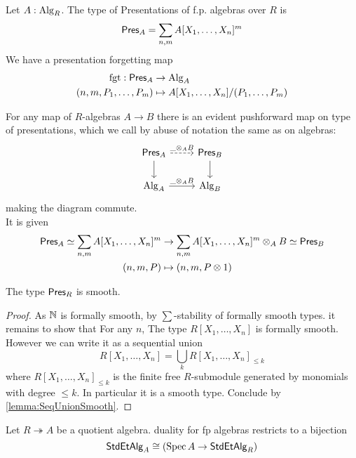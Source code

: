 \begin{definition}
	Let $A : \operatorname{Alg}_R$.
	 The type of Presentations of f.p. algebras over $R$ is 
	\[
	\mathsf{Pres}_A = \sum_{n,m} A[X_1,\hdots,X_n]^m
	\]
	We have a presentation forgetting map 
	\begin{align*}
		\mathrm{fgt} :\mathsf{Pres}_A &\to \operatorname{Alg}_A \\
		(n,m, P_1,\hdots,P_m) &\mapsto A[X_1,\hdots,X_n] / (P_1,\hdots,P_m)
	\end{align*}

	
\end{definition}
\begin{construction}
	For any map of $R$-algebras $A \to B$ there is an evident pushforward map on type of presentations, which we call by abuse of notation the same as on algebras:
	\[\begin{tikzcd}
		{\Pres_A} & {\Pres_B} \\
		{\Alg_A} & {\Alg_B}
		\arrow["\_ \otimes_A B",dashed, from=1-1, to=1-2]
		\arrow[from=1-1, to=2-1]
		\arrow[from=1-2, to=2-2]
		\arrow["{\_ \otimes_A B}", from=2-1, to=2-2]
	\end{tikzcd}\]
	making the diagram commute. \\
	It is given 
	\begin{align*}
		{\mathsf{Pres}_A} \simeq \sum_{n,m} A[X_1,\hdots,X_n]^m &\to \sum_{n,m} A[X_1,\hdots,X_n]^m \otimes_A B \simeq {\mathsf{Pres}_B} \\
		(n,m,P) &\mapsto (n,m,P\otimes 1)
	\end{align*}	
\end{construction}
\begin{lemma}
	The type $\mathsf{Pres}_R$ is smooth.
\end{lemma}

\begin{proof}
	As $\mathbb{N}$ is formally smooth, by $\sum$-stability of formally smooth types. it remains to show that  For any $n$, The type $R[X_1,\hdots,X_n]$ is formally smooth. However we can write it as a sequential union
	\[
	R[X_1,\hdots,X_n] = \bigcup_k R[X_1,\hdots,X_n]_{\le k}
	\]
	where $ R[X_1,\hdots,X_n]_{\le k}$ is the finite free $R$-submodule generated by monomials with degree $\le k$. In particular it is a smooth type. Conclude by \ref{lemma:SeqUnionSmooth}.
\end{proof}
\begin{lemma}
	Let $R \twoheadrightarrow A$ be a quotient algebra. duality for fp algebras restricts to a bijection
	\[
	\mathsf{StdEtAlg}_A \cong (\operatorname{Spec} A \to \mathsf{StdEtAlg}_R)
	\]
\end{lemma}

